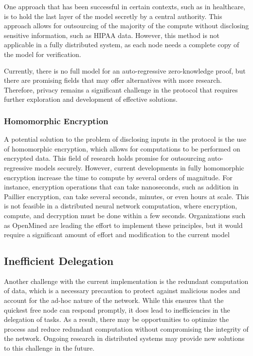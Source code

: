 \documentclass{article}
\begin{document}
One approach that has been successful in certain contexts, such as in healthcare, is to hold the last layer of the model secretly by a central authority. 
This approach allows for outsourcing of the majority of the compute without disclosing sensitive information, such as HIPAA data. 
However, this method is not applicable in a fully distributed system, as each node needs a complete copy of the model for verification.

Currently, there is no full model for an auto-regressive zero-knowledge proof, but there are promising fields that may offer alternatives with more research. 
Therefore, privacy remains a significant challenge in the protocol that requires further exploration and development of effective solutions.
\subsubsection{Homomorphic Encryption}
A potential solution to the problem of disclosing inputs in the protocol is the use of homomorphic encryption, which allows for computations to be performed on encrypted data. 
This field of research holds promise for outsourcing auto-regressive models securely. 
However, current developments in fully homomorphic encryption increase the time to compute by several orders of magnitude. 
For instance, encryption operations that can take nanoseconds, such as addition in Paillier encryption, can take several seconds, minutes, or even hours at scale. 
This is not feasible in a distributed neural network computation, where encryption, compute, and decryption must be done within a few seconds. 
Organizations such as OpenMined are leading the effort to implement these principles, but it would require a significant amount of effort and modification to the current model
\subsection{Inefficient Delegation}
Another challenge with the current implementation is the redundant computation of data, which is a necessary precaution to protect against malicious nodes and account for the ad-hoc nature of the network. 
While this ensures that the quickest free node can respond promptly, it does lead to inefficiencies in the delegation of tasks. 
As a result, there may be opportunities to optimize the process and reduce redundant computation without compromising the integrity of the network. Ongoing research in distributed systems may provide new solutions to this challenge in the future.
\end{document}
